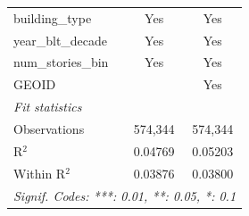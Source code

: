 \begin{tabular}{lcc}
   building\_type          & Yes            & Yes\\  
   year\_blt\_decade       & Yes            & Yes\\  
   num\_stories\_bin       & Yes            & Yes\\  
   GEOID                   &                & Yes\\  
   \midrule
   \emph{Fit statistics}\\
   Observations            & 574,344        & 574,344\\  
   R$^2$                   & 0.04769        & 0.05203\\  
   Within R$^2$            & 0.03876        & 0.03800\\  
   \midrule \midrule
   \multicolumn{3}{l}{\emph{Signif. Codes: ***: 0.01, **: 0.05, *: 0.1}}\\
\end{tabular}
\par\endgroup
\begingroup
\centering
